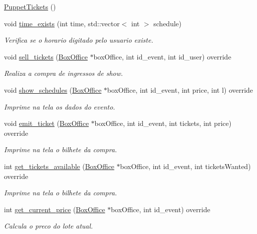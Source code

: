 \begin{DoxyCompactItemize}
\item 
\hyperlink{class_puppet_tickets_ac5cbccccc59aa7c88ebebab8b97eafdf}{Puppet\+Tickets} ()
\item 
void \hyperlink{class_puppet_tickets_adb4f3ea38df65d39fb9d9599dc22460b}{time\+\_\+exists} (int time, std\+::vector$<$ int $>$ schedule)
\begin{DoxyCompactList}\small\item\em Verifica se o horario digitado pelo usuario existe. \end{DoxyCompactList}\item 
void \hyperlink{class_puppet_tickets_a719a391bb489e9f741a1caabbaa2d2b8}{sell\+\_\+tickets} (\hyperlink{class_box_office}{Box\+Office} $\ast$box\+Office, int id\+\_\+event, int id\+\_\+user) override
\begin{DoxyCompactList}\small\item\em Realiza a compra de ingressos de show. \end{DoxyCompactList}\item 
void \hyperlink{class_puppet_tickets_a45d59ff08614919b1afad11dff21d5e4}{show\+\_\+schedules} (\hyperlink{class_box_office}{Box\+Office} $\ast$box\+Office, int id\+\_\+event, int price, int l) override
\begin{DoxyCompactList}\small\item\em Imprime na tela os dados do evento. \end{DoxyCompactList}\item 
void \hyperlink{class_puppet_tickets_a1d458fbaa6f21e2ba82c805299bb5025}{emit\+\_\+ticket} (\hyperlink{class_box_office}{Box\+Office} $\ast$box\+Office, int id\+\_\+event, int tickets, int price) override
\begin{DoxyCompactList}\small\item\em Imprime na tela o bilhete da compra. \end{DoxyCompactList}\item 
int \hyperlink{class_puppet_tickets_a8b76b650cb25cdccd1c8fb8c81585353}{get\+\_\+tickets\+\_\+available} (\hyperlink{class_box_office}{Box\+Office} $\ast$box\+Office, int id\+\_\+event, int tickets\+Wanted) override
\begin{DoxyCompactList}\small\item\em Imprime na tela o bilhete da compra. \end{DoxyCompactList}\item 
int \hyperlink{class_puppet_tickets_a73477909b6f61d1fff4afff51d26e6b6}{get\+\_\+current\+\_\+price} (\hyperlink{class_box_office}{Box\+Office} $\ast$box\+Office, int id\+\_\+event) override
\begin{DoxyCompactList}\small\item\em Calcula o preco do lote atual. \end{DoxyCompactList}\end{DoxyCompactItemize}
